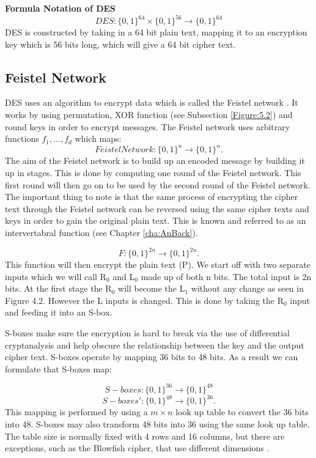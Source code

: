 \documentclass[11pt,a4paper, notitlepage]{report}
\begin{document}
\textbf{Formula Notation of DES}
\begin{displaymath}
DES: \{0,1\}^{64} \times \{0,1\}^{56} \rightarrow \{0,1\}^{64}
\end{displaymath}
DES is constructed by taking in a 64 bit plain text, mapping it to an encryption key which is 56 bits long, which will give a 64 bit cipher text.

\subsection{Feistel Network}
\label{subsec:FeistelNet}

DES uses an algorithm to encrypt data which is called the Feistel network \cite{DBLP:books/sp/Buchmann02}. It works by using permutation, XOR function (see Subsection \ref{Figure:5.2}) and round keys in order to encrypt messages. The Feistel network uses arbitrary functions $f_{1},...,f_{d}$ which maps:
\begin{displaymath}
FeistelNetwork: \{0,1\}^n \rightarrow \{0,1\}^n.
\end{displaymath}
The aim of the Feistel network is to build up an encoded message by building it up in stages. This is done by computing one round of the Feistel network. This first round will then go on to be used by the second round of the Feistel network. The important thing to note is that the same process of encrypting the cipher text through the Feistel network can be reversed using the same cipher texts and keys in order to gain the original plain text. This is known and referred to as an intervertabral function (see Chapter \ref{cha:AnBack}).

\begin{displaymath}
F: \{0,1\}^{2n} \rightarrow \{0,1\}^{2n}.
\end{displaymath}
This function will then encrypt the plain text (P). We start off with two separate inputs which we will call R$_{0}$ and L$_{0}$ made up of both n bits. The total input is 2n bits. At the first stage the R$_{0}$ will become the L$_{1}$ without any change as seen in Figure 4.2. However the L inputs is changed. This is done by taking the R$_{0}$ input and feeding it into an S-box. 

S-boxes make sure the encryption is hard to break via the use of differential cryptanalysis and help obscure the relationship between the key and the output cipher text. S-boxes operate by mapping 36 bits to 48 bits. As a result we can formulate that S-boxes map:

\begin{displaymath}
S-boxes: \{0, 1\}^{36} \rightarrow \{0, 1\}^{48}
\end{displaymath} 
\begin{displaymath}
S-boxes': \{0, 1\}^{48} \rightarrow \{0, 1\}^{36}.
\end{displaymath} 
This mapping is performed by using a $m \times n$ look up table to convert the 36 bits into 48. S-boxes may also transform 48 bits into 36 using the same look up table. The table size is normally fixed with 4 rows and 16 columns, but there are exceptions, such as the Blowfish cipher, that use different dimensions \cite{SchneierBlowfish1993}.
\end{document}
